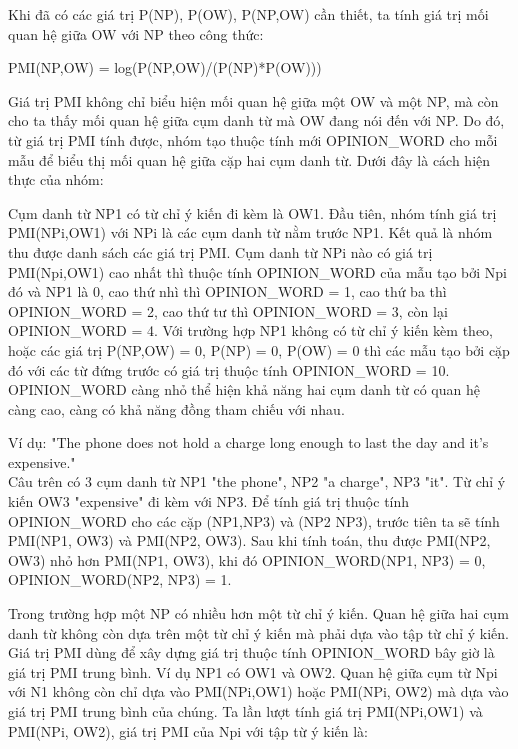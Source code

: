 \documentclass[12pt]{extarticle}
\begin{document}
				\par Khi đã có các giá trị P(NP), P(OW), P(NP,OW) cần thiết, ta tính giá trị mối quan hệ giữa OW với NP theo công thức:
				\begin{center}
					PMI(NP,OW) = log(P(NP,OW)/(P(NP)*P(OW)))
				\end{center}
				\par Giá trị PMI không chỉ biểu hiện mối quan hệ giữa một OW và một NP, mà còn cho ta thấy mối quan hệ giữa cụm danh từ mà OW đang nói đến với NP. Do đó, từ giá trị PMI tính được, nhóm tạo thuộc tính mới OPINION\_WORD cho mỗi mẫu để biểu thị mối quan hệ giữa cặp hai cụm danh từ. Dưới đây là cách hiện thực của nhóm: 
				\par Cụm danh từ NP1 có từ chỉ ý kiến đi kèm là OW1. Đầu tiên, nhóm tính giá trị PMI(NPi,OW1) với NPi là các cụm danh từ nằm trước NP1. Kết quả là nhóm thu được danh sách các giá trị PMI. Cụm danh từ NPi nào có giá trị PMI(Npi,OW1) cao nhất thì thuộc tính OPINION\_WORD của mẫu tạo bởi Npi đó và NP1 là 0, cao thứ nhì thì OPINION\_WORD = 1, cao thứ ba thì OPINION\_WORD = 2, cao thứ tư thì OPINION\_WORD = 3, còn lại OPINION\_WORD = 4. Với trường hợp NP1 không có từ chỉ ý kiến kèm theo, hoặc các giá trị P(NP,OW) = 0, P(NP) = 0, P(OW) = 0 thì  các mẫu tạo bởi cặp đó với các từ đứng trước có giá trị thuộc tính OPINION\_WORD = 10. OPINION\_WORD càng nhỏ thể hiện khả năng hai cụm danh từ có quan hệ càng cao, càng có khả năng đồng tham chiếu với nhau.
				\par Ví dụ: "The phone does not hold a charge long enough to last the day and it’s expensive."
				\\Câu trên có 3 cụm danh từ NP1 "the phone", NP2 "a charge", NP3 "it". Từ chỉ ý kiến OW3 "expensive" đi kèm với NP3. Để tính giá trị thuộc tính OPINION\_WORD cho các cặp (NP1,NP3) và (NP2 NP3), trước tiên ta sẽ tính PMI(NP1, OW3) và PMI(NP2, OW3). Sau khi tính toán, thu được PMI(NP2, OW3) nhỏ hơn PMI(NP1, OW3), khi đó OPINION\_WORD(NP1, NP3) = 0, OPINION\_WORD(NP2, NP3) = 1.
				\par Trong trường hợp một NP có nhiều hơn một từ chỉ ý kiến. Quan hệ giữa hai cụm danh từ không còn dựa trên một từ chỉ ý kiến mà phải dựa vào tập từ chỉ ý kiến. Giá trị PMI dùng để xây dựng giá trị thuộc tính OPINION\_WORD bây giờ là giá trị PMI trung bình. Ví dụ NP1 có OW1 và OW2. Quan hệ giữa cụm từ Npi với N1 không còn chỉ dựa vào PMI(NPi,OW1) hoặc PMI(NPi, OW2) mà dựa vào giá trị PMI trung bình của chúng. Ta lần lượt tính giá trị PMI(NPi,OW1) và PMI(NPi, OW2), giá trị PMI của Npi với tập từ ý kiến là:
\end{document}
